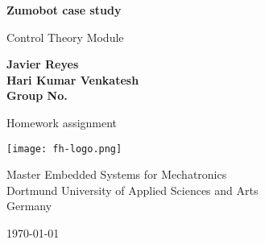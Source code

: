 \begin{titlepage}
  \begin{center}
    \vspace*{1cm}

    \Huge
    \textbf{Zumobot case study}

    \vspace{0.5cm}

    \LARGE
    {Control Theory Module}

    \vspace{3.5cm}

    \textbf{Javier Reyes\\
            Hari Kumar Venkatesh\\
						Group No. }

    \vfill

    {Homework assignment}

    \vspace{2cm}

    \texttt{[image: fh-logo.png]}

    \vspace{1cm}

    \Large
    {Master Embedded Systems for Mechatronics\\
    Dortmund University of Applied Sciences and Arts\\
    Germany}

    \vspace{0.5cm}

    \large
    {\today}

  \end{center}
\end{titlepage}
